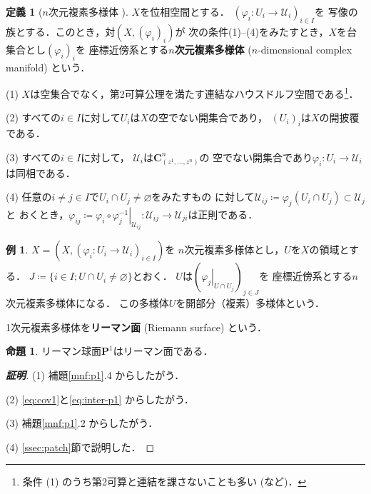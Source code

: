 \documentclass[11pt, a4paper, dvipdfmx, draft]{jsarticle}
\theoremstyle{definition}
\newtheorem{Definition}[Axiom]{定義}
\newtheorem{Proposition}[Axiom]{命題}
\newtheorem{Example}[Axiom]{例}
\newcommand{\cc}{\mathbf{C}}
\newcommand{\pp}{\mathbf{P}}
\newcommand{\mcal}{\mathcal}
\newcommand{\pphi}{\varphi} %
\newcommand{\UU}{\mcal{U}}
\newcommand{\emp}{\varnothing}
\newcommand{\ceq}{\coloneqq}
\newcommand{\sbs}{\subset}
\newcommand{\mapres}[2]{\left. #1 \right|_{#2}}
\theoremstyle{mystyle}
\numberwithin{equation}{section} %
\begin{document}
\begin{Definition}[$n$次元複素多様体 {\cite[定義4.1]{ogs}}]
    $X$を位相空間とする．
    $(\pphi_{i}\colon U_{i}\to \UU_{i})_{i\in I}$を
    写像の族とする．このとき，対$(X,(\pphi_{i})_{i})$が
    次の条件(1)--(4)をみたすとき，$X$を台集合とし$(\pphi_{i})_i$を
    座標近傍系とする\textbf{$n$次元複素多様体} ($n$-dimensional complex manifold) という．

    (1) 
    $X$は空集合でなく，第2可算公理を満たす連結なハウスドルフ空間である\footnote{
        条件 (1) のうち第2可算と連結を課さないことも多い (\cite{kobayashi1}など)．}．

    (2) 
    すべての$i\in I$に対して$U_i$は$X$の空でない開集合であり，
    $(U_i)_i$は$X$の開披覆である．

    (3) 
    すべての$i\in I$に対して，
    $\UU_i$は$\cc^{n}_{(z^{1},\dots,z^{n})}$の
    空でない開集合であり$\pphi_{i}\colon U_i\to\UU_i$は同相である．

    (4) 
    任意の$i\neq j \in I$で$U_i\cap U_j \neq \emp$をみたすもの
    に対して$\UU_{ij}\ceq \pphi_j(U_i\cap U_j)\sbs \UU_j$と
    おくとき，$\pphi_{ij}\ceq 
    \mapres{\pphi_{i}\circ\pphi_{j}^{-1}}{\UU_{ij}}
    \colon 
    \UU_{ij}\to\UU_{ji}$は正則である．
\end{Definition}

\begin{Example}\label{ex:openR}
    $X=(X, (\pphi_{i}\colon U_{i}\to \UU_{i})_{i\in I})$を
    $n$次元複素多様体とし，$U$を$X$の領域とする．
    $J\coloneqq\{i\in I; U\cap U_i \neq \emp\}$とおく．
    $U$は$(\mapres{\pphi_{j}}{U\cap U_{j}})_{j\in J}$を
    座標近傍系とする$n$次元複素多様体になる．
    この多様体$U$を開部分（複素）多様体という．
\end{Example}

1次元複素多様体を\textbf{リーマン面} (Riemann surface) という．

\begin{Proposition}
    リーマン球面$\pp^1$はリーマン面である．    
\end{Proposition}

\begin{proof}[\bf{証明}]
    (1) 
    補題\ref{mnf:p1}.4 からしたがう．

    (2) 
    \eqref{eq:cov1}と\eqref{eq:inter-p1} からしたがう．

    (3) 
    補題\ref{mnf:p1}.2 からしたがう．

    (4) 
    \ref{ssec:patch}節で説明した．
\end{proof}
\end{document}
